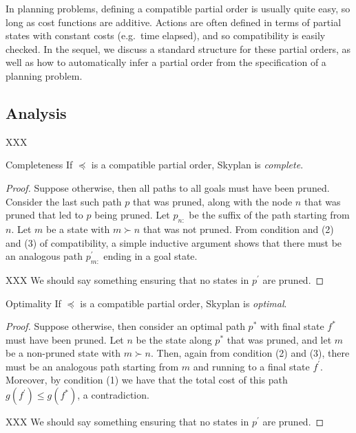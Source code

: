 \documentclass[letterpaper]{article}
\theoremstyle{plain} \newtheorem{theorem}{Theorem} \newtheorem{proposition}{Proposition} \newtheorem{lemma}{Lemma}
\theoremstyle{definition} \newtheorem{definition}{Definition} \newtheorem{conjecture}{Conjecture} \newtheorem*{example}{Example}
\theoremstyle{remark} \newtheorem*{remark}{Remark} \newtheorem*{note}{Note} \newtheorem{case}{Case}
\begin{document}
In planning problems, defining a compatible partial order is usually
quite easy, so long as cost functions are additive.  Actions are
often defined in terms of partial states with constant costs (e.g.\
time elapsed), and so compatibility is easily checked.  In the
sequel, we discuss a standard structure for these partial orders,
as well as how to automatically infer a partial order from the
specification of a planning problem.

\subsection{Analysis}

XXX

\begin{claim}{Completeness}\label{clm-complete}
   If $\preceq$ is a compatible partial order, Skyplan
is \emph{complete}.
\end{claim}
\begin{proof} Suppose otherwise, then all paths to all goals must
have been pruned. Consider the last such path $p$ that was pruned, along
with the node $n$ that was pruned that led to $p$ being pruned. Let $p_{n:}$ be the suffix of the
path starting from $n$. Let $m$ be a state with $m \succ n$ that was
not pruned. From condition and (2) and (3) of compatibility, a simple
inductive argument shows that there must be an analogous path 
$p^\prime_{m:}$ ending in a goal state.

  XXX We should say something ensuring that no states in $p^\prime$ are pruned.
\end{proof}
  
\begin{claim}{Optimality}\label{clm-optimal}
   If $\preceq$ is a compatible partial order, Skyplan
is \emph{optimal}.
\end{claim}
\begin{proof} Suppose otherwise, then consider an optimal path $p^*$ with final state $f^*$
  must have been pruned. Let $n$ be the state along $p^*$ that
  was pruned, and let $m$ be a non-pruned state with $m \succ n$.
  Then, again from condition (2) and (3), there must be an analogous path
  starting from $m$ and running to a final state $f^\prime$. Moreover, by condition (1)
  we have that the total cost of this path $g(f^\prime) \le g(f^*)$, a contradiction.

  XXX We should say something ensuring that no states in $p^\prime$ are pruned.
\end{proof}
\end{document}
